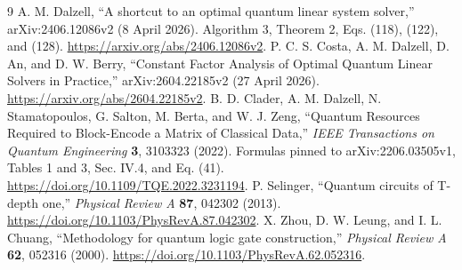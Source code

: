 \documentclass[11pt]{article}
\begin{document}
\begin{thebibliography}{9}
 A. M. Dalzell, ``A shortcut to an optimal quantum linear system solver,'' arXiv:2406.12086v2 (8 April 2026). Algorithm 3, Theorem 2, Eqs. (118), (122), and (128). \url{https://arxiv.org/abs/2406.12086v2}.
 P. C. S. Costa, A. M. Dalzell, D. An, and D. W. Berry, ``Constant Factor Analysis of Optimal Quantum Linear Solvers in Practice,'' arXiv:2604.22185v2 (27 April 2026). \url{https://arxiv.org/abs/2604.22185v2}.
 B. D. Clader, A. M. Dalzell, N. Stamatopoulos, G. Salton, M. Berta, and W. J. Zeng, ``Quantum Resources Required to Block-Encode a Matrix of Classical Data,'' \emph{IEEE Transactions on Quantum Engineering} \textbf{3}, 3103323 (2022). Formulas pinned to arXiv:2206.03505v1, Tables 1 and 3, Sec. IV.4, and Eq. (41). \url{https://doi.org/10.1109/TQE.2022.3231194}.
 P. Selinger, ``Quantum circuits of T-depth one,'' \emph{Physical Review A} \textbf{87}, 042302 (2013). \url{https://doi.org/10.1103/PhysRevA.87.042302}.
 X. Zhou, D. W. Leung, and I. L. Chuang, ``Methodology for quantum logic gate construction,'' \emph{Physical Review A} \textbf{62}, 052316 (2000). \url{https://doi.org/10.1103/PhysRevA.62.052316}.
\end{thebibliography}
\end{document}
